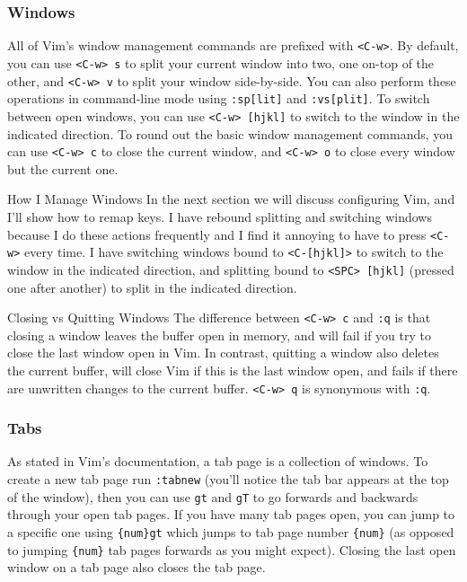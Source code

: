 \documentclass{beamer}
\begin{document}
\begin{frame}[fragile]
    \frametitle{Windows}
    \small
	All of Vim's window management commands are prefixed with \verb+<C-w>+. By default, you can use \verb+<C-w> s+ to split your current window into two, one on-top of the other, and \verb+<C-w> v+ to split your window side-by-side. You can also perform these operations in command-line mode using \verb+:sp[lit]+ and \verb+:vs[plit]+. To switch between open windows, you can use \verb+<C-w> [hjkl]+ to switch to the window in the indicated direction. To round out the basic window management commands, you can use \verb+<C-w> c+ to close the current window, and \verb+<C-w> o+ to close every window but the current one.\\
	\vspace{0.5cm}
	\begin{block}{How I Manage Windows}
		In the next section we will discuss configuring Vim, and I'll show how to remap keys. I have rebound splitting and switching windows because I do these actions frequently and I find it annoying to have to press \verb+<C-w>+ every time. I have switching windows bound to \verb+<C-[hjkl]>+ to switch to the window in the indicated direction, and splitting bound to \verb+<SPC> [hjkl]+ (pressed one after another) to split in the indicated direction.
	\end{block}
\end{frame}

\begin{frame}[fragile]
	\begin{block}{Closing vs Quitting Windows}
		The difference between \verb+<C-w> c+ and \verb+:q+ is that closing a window leaves the buffer open in memory, and will fail if you try to close the last window open in Vim. In contrast, quitting a window also deletes the current buffer, will close Vim if this is the last window open, and fails if there are unwritten changes to the current buffer. \verb+<C-w> q+ is synonymous with \verb+:q+.
	\end{block}
\end{frame}

\begin{frame}[fragile]
    \frametitle{Tabs}
    \small
	As stated in Vim's documentation, a tab page is a collection of windows. To create a new tab page run \verb+:tabnew+ (you'll notice the tab bar appears at the top of the window), then you can use \verb+gt+ and \verb+gT+ to go forwards and backwards through your open tab pages. If you have many tab pages open, you can jump to a specific one using \verb+{num}gt+ which jumps to tab page number \verb+{num}+ (as opposed to jumping \verb+{num}+ tab pages forwards as you might expect). Closing the last open window on a tab page also closes the tab page.
\end{frame}
\end{document}
